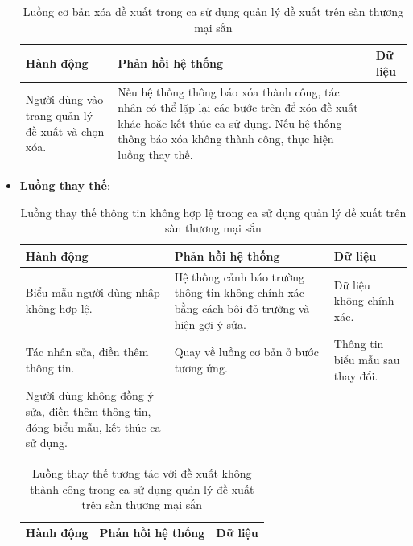 \documentclass[./../main.tex]{subfiles}
\begin{document}
\begin{itemize}
\begin{table}[H]
\begin{tabularx}{\textwidth}{| X | X | X |}
        \\ \hline
    \end{tabularx}
    \end{table}
    \begin{table}[H]
    \caption{\label{uc-37}Luồng cơ bản xóa đề xuất trong ca sử dụng quản lý đề xuất trên sàn thương mại sắn}
    \begin{tabularx}{\textwidth}{| X | X | X |}
        \hline
        \textbf{Hành động} & \textbf{Phản hồi hệ thống} & \textbf{Dữ liệu}
        \\ \hline
        Người dùng vào trang quản lý đề xuất và chọn xóa. & Nếu hệ thống thông báo xóa thành công, tác nhân có thể lặp lại các bước trên để xóa đề xuất khác hoặc kết thúc ca sử dụng. Nếu hệ thống thông báo xóa không thành công, thực hiện luồng thay thế. & 
        \\ \hline
    \end{tabularx}
    \end{table}
    \item \textbf{Luồng thay thế}: 
        \begin{table}[H]
        \caption{\label{uc-38}Luồng thay thế thông tin không hợp lệ trong ca sử dụng quản lý đề xuất trên sàn thương mại sắn}
        \begin{tabularx}{\textwidth}{| X | X | X |}
            \hline
            \textbf{Hành động} & \textbf{Phản hồi hệ thống} & \textbf{Dữ liệu} \\ \hline
            Biểu mẫu người dùng nhập không hợp lệ. & Hệ thống cảnh báo trường thông tin không chính xác bằng cách bôi đỏ trường và hiện gợi ý sửa. & Dữ liệu không chính xác.
            \\ \hline
            Tác nhân sửa, điền thêm thông tin. & Quay về luồng cơ bản ở bước tương ứng. & Thông tin biểu mẫu sau thay đổi.
            \\ \hline
            Người dùng không đồng ý sửa, điền thêm thông tin, đóng biểu mẫu, kết thúc ca sử dụng. & & 
            \\ \hline
        \end{tabularx}
        \end{table}
        \begin{table}[H]
        \caption{\label{uc-39}Luồng thay thế tương tác với đề xuất không thành công trong ca sử dụng quản lý đề xuất trên sàn thương mại sắn}
        \begin{tabularx}{\textwidth}{| X | X | X |}
            \hline
            \textbf{Hành động} & \textbf{Phản hồi hệ thống} & \textbf{Dữ liệu} \\ \hline

\end{tabularx}
\end{table}
\end{itemize}
\end{document}
